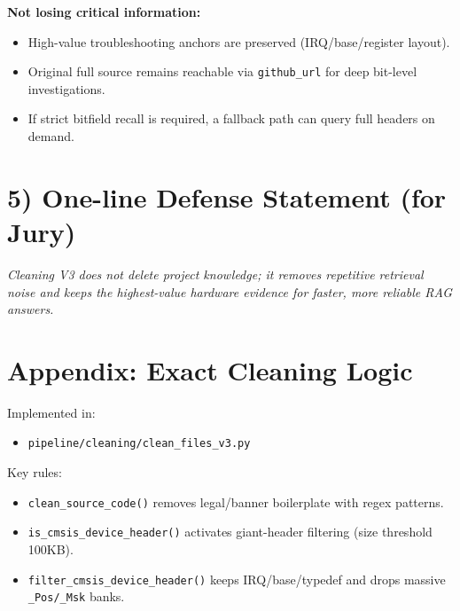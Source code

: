 \documentclass[11pt,a4paper]{article}
\begin{document}
\textbf{Not losing critical information:}
\begin{itemize}
  \item High-value troubleshooting anchors are preserved (IRQ/base/register layout).
  \item Original full source remains reachable via \texttt{github\_url} for deep bit-level investigations.
  \item If strict bitfield recall is required, a fallback path can query full headers on demand.
\end{itemize}

\section*{5) One-line Defense Statement (for Jury)}
\textit{Cleaning V3 does not delete project knowledge; it removes repetitive retrieval noise and keeps the highest-value hardware evidence for faster, more reliable RAG answers.}

\section*{Appendix: Exact Cleaning Logic}
Implemented in:
\begin{itemize}
  \item \texttt{pipeline/cleaning/clean\_files\_v3.py}
\end{itemize}

Key rules:
\begin{itemize}
  \item \texttt{clean\_source\_code()} removes legal/banner boilerplate with regex patterns.
  \item \texttt{is\_cmsis\_device\_header()} activates giant-header filtering (size threshold 100KB).
  \item \texttt{filter\_cmsis\_device\_header()} keeps IRQ/base/typedef and drops massive \texttt{\_Pos/\_Msk} banks.
\end{itemize}
\end{document}

